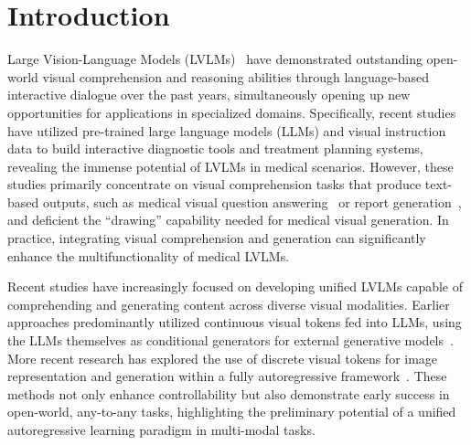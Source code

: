 \section{Introduction}
\label{Introduction}
Large Vision-Language Models (LVLMs)~\cite{liu2023llava, gpt4v, llavanext, chen2024far} have demonstrated outstanding open-world visual comprehension and reasoning abilities through language-based interactive dialogue over the past years, simultaneously opening up new opportunities for applications in specialized domains. Specifically, recent studies~\cite{li2024llava-med,tu2024towards} have utilized pre-trained large language models (LLMs) and visual instruction data to build interactive diagnostic tools and treatment planning systems, revealing the immense potential of LVLMs in medical scenarios. 
However, these studies primarily concentrate on visual comprehension tasks that produce text-based outputs, such as medical visual question answering~\cite{li2024llava-med} or report generation~\cite{nath2024vila}, and deficient the ``drawing'' capability needed for medical visual generation. 
In practice, integrating visual comprehension and generation can significantly enhance the multifunctionality of medical LVLMs.

Recent studies have increasingly focused on developing unified LVLMs capable of comprehending and generating content across diverse visual modalities. Earlier approaches predominantly utilized continuous visual tokens fed into LLMs, using the LLMs themselves as conditional generators for external generative models~\cite{ge2024seed,wu2023next,dong2023dreamllm}. More recent research has explored the use of discrete visual tokens for image representation and generation within a fully autoregressive framework~\cite{team2024chameleon,wang2024emu3,xie2024show}. These methods not only enhance controllability but also demonstrate early success in open-world, any-to-any tasks, highlighting the preliminary potential of a unified autoregressive learning paradigm in multi-modal tasks. 

